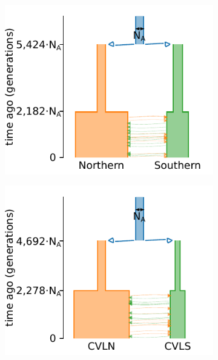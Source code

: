 \begin{figure}[ht]
    \centering
    \begin{subfigure}[b]{.33\textwidth}
    \includegraphics[width=\textwidth]{images_experiments/gaboon_forest_frog/picture_1pop_model_nor_sou.pdf}
    \label{fig:part2:experiments:frog:results_1}
    \end{subfigure}%
    \begin{subfigure}[b]{.33\textwidth}
    \includegraphics[width=\textwidth]{images_experiments/gaboon_forest_frog/picture_1pop_model_cvln_cvls.pdf}

\end{subfigure}
\end{figure}
